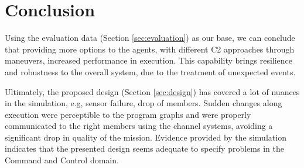 \section{Conclusion}
\label{sec:conclusion}

Using the evaluation data (Section \ref{sec:evaluation}) as our base, we can conclude that providing more options to the agents, with different C2 approaches through maneuvers, increased performance in execution. This capability brings resilience and robustness to the overall system, due to the treatment of unexpected events.

Ultimately, the proposed design (Section \ref{sec:design}) has covered a lot of nuances in the simulation, e.g, sensor failure, drop of members. Sudden changes along execution were perceptible to the program graphs and were properly communicated to the right members using the channel systems, avoiding a significant drop in quality of the mission. Evidence provided by the simulation indicates that the presented design seems adequate to specify problems in the Command and Control domain.